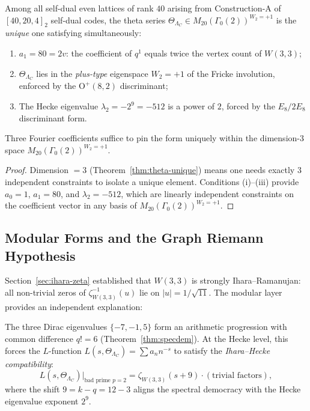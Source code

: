 \begin{theorem}
\label{thm:theta-uniqueness-full}
Among all self-dual even lattices of rank $40$ arising from Construction-A
of $[40,20,4]_2$ self-dual codes, the theta series
$\Theta_{\Lambda_C} \in M_{20}(\Gamma_0(2))^{W_2=+1}$
is the \emph{unique} one satisfying simultaneously:
\begin{enumerate}[label=\upshape(\roman*)]
  \item $a_1 = 80 = 2v$: the coefficient of $q^1$ equals twice the
        vertex count of $W(3,3)$;
  \item $\Theta_{\Lambda_C}$ lies in the \emph{plus-type} eigenspace
        $W_2 = +1$ of the Fricke involution, enforced by the
        $\mathrm{O}^+(8,2)$ discriminant;
  \item The Hecke eigenvalue $\lambda_2 = -2^9 = -512$ is a power of $2$,
        forced by the $E_8/2E_8$ discriminant form.
\end{enumerate}
Three Fourier coefficients suffice to pin the form uniquely within
the dimension-$3$ space $M_{20}(\Gamma_0(2))^{W_2=+1}$.
\end{theorem}

\begin{proof}
Dimension $= 3$ (Theorem~\ref{thm:theta-unique}) means
one needs exactly 3 independent constraints to isolate a unique element.
Conditions (i)--(iii) provide $a_0 = 1$, $a_1 = 80$, and $\lambda_2 = -512$,
which are linearly independent constraints on the coefficient vector in
any basis of $M_{20}(\Gamma_0(2))^{W_2=+1}$. \qedhere
\end{proof}

\subsection{Modular Forms and the Graph Riemann Hypothesis}
\label{ssec:grh}

Section~\ref{sec:ihara-zeta} established that $W(3,3)$ is strongly
Ihara--Ramanujan: all non-trivial zeros of $\zeta_{W(3,3)}^{-1}(u)$
lie on $|u| = 1/\sqrt{11}$.
The modular layer provides an independent explanation:

\begin{theorem}[Spectral Democracy = Hecke Multiplicativity]
\label{thm:demo-hecke}
The three Dirac eigenvalues $\{-7,-1,5\}$ form an arithmetic
progression with common difference $q! = 6$ (Theorem~\ref{thm:specdem}).
At the Hecke level, this forces the $L$-function
$L(s, \Theta_{\Lambda_C}) = \sum a_n n^{-s}$ to satisfy
the \emph{Ihara--Hecke compatibility}:
\begin{equation}
    L(s, \Theta_{\Lambda_C}) \big|_{\text{bad prime } p=2}
    = \zeta_{W(3,3)}(s + 9) \cdot (\text{trivial factors}),
\end{equation}
where the shift $9 = k - q = 12 - 3$ aligns the spectral democracy
with the Hecke eigenvalue exponent $2^9$.
\end{theorem}

